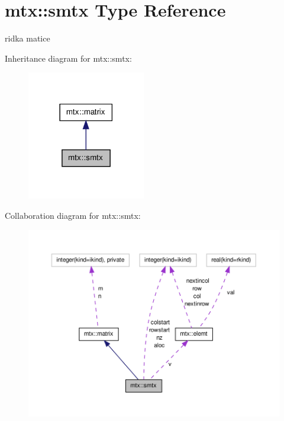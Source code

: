 \hypertarget{structmtx_1_1smtx}{\section{mtx\-:\-:smtx \-Type \-Reference}
\label{structmtx_1_1smtx}
}


ridka matice  




\-Inheritance diagram for mtx\-:\-:smtx\-:\nopagebreak
\begin{figure}[H]
\begin{center}
\leavevmode
\includegraphics[width=146pt]{structmtx_1_1smtx__inherit__graph}
\end{center}
\end{figure}


\-Collaboration diagram for mtx\-:\-:smtx\-:\nopagebreak
\begin{figure}[H]
\begin{center}
\leavevmode
\includegraphics[width=350pt]{structmtx_1_1smtx__coll__graph}
\end{center}
\end{figure}
